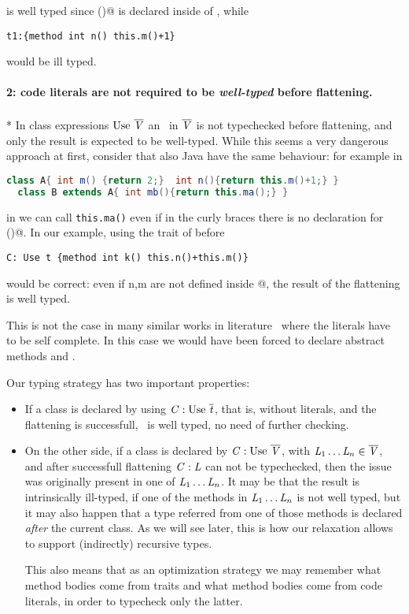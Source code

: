 \noindent \Q@t@ is well typed since \Q@m()@ is declared inside of \Q@t@, while

\saveSpace\begin{lstlisting}
t1:{method int n() this.m()+1} 
\end{lstlisting}\saveSpace
\noindent would be ill typed.

\paragraph{2: code literals are not required to be \emph{well-typed} before flattening.}${}_{}$\\*
In class expressions  $\use\ \overline\mV$
an \mL\ in $\overline{\mathit{V}}$ is not typechecked before flattening, and only the result is expected to be well-typed.
While this seems a very dangerous approach at first, consider that also Java have the same behaviour:
for example in
\saveSpace\begin{lstlisting}[language=Java]
  class A{ int m() {return 2;}  int n(){return this.m()+1;} }
  class B extends A{ int mb(){return this.ma();} }
\end{lstlisting}\saveSpace
\noindent in \Q@B@ we can call \lstinline{this.ma()} even if in the curly braces there is no declaration for \Q@ma()@.
In our example, using the trait \Q@t@ of before

\saveSpace\begin{lstlisting}
C: Use t {method int k() this.n()+this.m()}
\end{lstlisting}\saveSpace
\noindent would be correct: even if n,m are not defined inside
@,
the result of the flattening is well typed.

This is not the case in many similar works in literature~\cite{deep,Bettini2015282,Bergel2007} where the
literals have to be self complete. In this case we would have been forced to
declare abstract methods \Q@n@ and \Q@m@.

Our typing strategy has two important properties:
\begin{itemize}
\item If a class is declared by using $\mC : \use\ \overline\mt$, that is, without literals,
and the flattening is successfull, \mC\ is well typed, no need of further checking.
\item On the other side, if a class is declared by $\mC : \use\ \overline\mV$, with
$\mathit{L}_1\ldots\mathit{L}_n \in \overline{\mathit{V}}$, and after successfull flattening $\mathit{C} : \mathit{L}$ can not be typechecked,
then the issue was originally present in one of $\mathit{L}_1\ldots\mathit{L}_n$.
It may be that the result is intrinsically ill-typed, if one of the methods in $\mathit{L}_1\ldots\mathit{L}_n$ is not well typed,
but it may also happen that a type referred from one of those methods is declared \emph{after} the current class. As we will see later, this is how our relaxation allows to support (indirectly) recursive types.

This also means that as an optimization strategy
 we may remember what method bodies come from traits and what method bodies come from code literals, in order to typecheck only the latter.
 \end{itemize}

